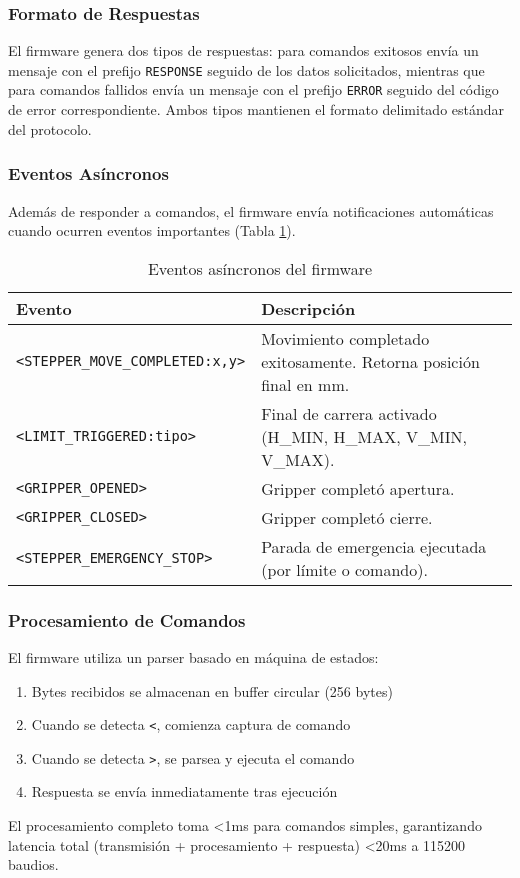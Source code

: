 \subsubsection{Formato de Respuestas}

El firmware genera dos tipos de respuestas: para comandos exitosos envía un mensaje con el prefijo \texttt{RESPONSE} seguido de los datos solicitados, mientras que para comandos fallidos envía un mensaje con el prefijo \texttt{ERROR} seguido del código de error correspondiente. Ambos tipos mantienen el formato delimitado estándar del protocolo.

\subsubsection{Eventos Asíncronos}

Además de responder a comandos, el firmware envía notificaciones automáticas cuando ocurren eventos importantes (Tabla \ref{tab:eventos_asincronos}).

\begin{table}[H]
\centering
\caption{Eventos asíncronos del firmware}
\label{tab:eventos_asincronos}
\begin{tabular}{|l|p{8cm}|}
\hline
\textbf{Evento} & \textbf{Descripción} \\
\hline
\texttt{<STEPPER\_MOVE\_COMPLETED:x,y>} & Movimiento completado exitosamente. Retorna posición final en mm. \\
\hline
\texttt{<LIMIT\_TRIGGERED:tipo>} & Final de carrera activado (H\_MIN, H\_MAX, V\_MIN, V\_MAX). \\
\hline
\texttt{<GRIPPER\_OPENED>} & Gripper completó apertura. \\
\hline
\texttt{<GRIPPER\_CLOSED>} & Gripper completó cierre. \\
\hline
\texttt{<STEPPER\_EMERGENCY\_STOP>} & Parada de emergencia ejecutada (por límite o comando). \\
\hline
\end{tabular}
\end{table}

\subsubsection{Procesamiento de Comandos}

El firmware utiliza un parser basado en máquina de estados:

\begin{enumerate}
    \item Bytes recibidos se almacenan en buffer circular (256 bytes)
    \item Cuando se detecta \texttt{<}, comienza captura de comando
    \item Cuando se detecta \texttt{>}, se parsea y ejecuta el comando
    \item Respuesta se envía inmediatamente tras ejecución
\end{enumerate}

El procesamiento completo toma <1ms para comandos simples, garantizando latencia total (transmisión + procesamiento + respuesta) <20ms a 115200 baudios.
